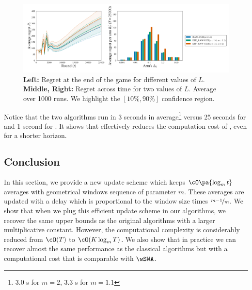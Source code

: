 \begin{figure}[!ht]
\centering
\includegraphics[width = 0.99 \textwidth]{2.1Rested/fig/fig2_eff.pdf}
\caption{\textbf{Left:} Regret at the end of the game for different values of $L$. \textbf{Middle, Right:} Regret across time for two values of $L$. Average over 1000 runs. We highlight the $\left[10\%, 90\%\right]$ confidence region.}
\label{fig:rested-eff2}
\end{figure}

Notice that the two algorithms run in 3 seconds in average\footnote{3.0 s for $m=2$, 3.3 s for $m=1.1$} versus 25 seconds for \RAWUCB and 1 second for \wSWA. It shows that \EFFRAW effectively reduces the computation cost of \RAWUCB, even for a shorter horizon.



\subsection{Conclusion}
In this section, we provide a new update scheme which keeps $\cO\pa{\log_m t}$ averages with geometrical windows sequence of parameter $m$. These averages are updated with a delay which is proportional to the window size times $\nicefrac{m-1}{m}$. We show that when we plug this efficient update scheme in our algorithms, we recover the same upper bounds as the original algorithms with a larger multiplicative constant. However, the computational complexity is considerably reduced from $\cO(T)$ to $\cO(K\log_m T)$. We also show that in practice we can recover almost the same performance as the classical algorithms but with a computational cost that is comparable with $\wSWA$.